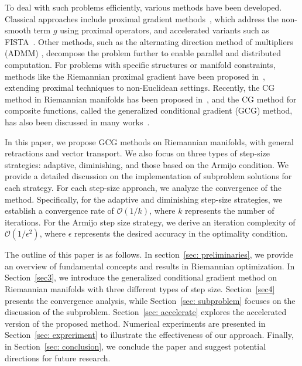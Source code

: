 \documentclass[pdflatex,sn-mathphys-num]{sn-jnl}%
\theoremstyle{definition} %
\theoremstyle{remark} %
\begin{document}
To deal with such problems efficiently, various methods have been developed. Classical approaches include proximal gradient methods~\cite{beck2017first, FM81,parikh2014proximal}, which address the non-smooth term \( g \) using proximal operators, and accelerated variants such as FISTA~\cite{beck2009fast}.  Other methods, such as the alternating direction method of multipliers (ADMM) \cite{boyd2011distributed}, decompose the problem further to enable parallel and distributed computation. For problems with specific structures or manifold constraints, methods like the Riemannian proximal gradient have been proposed in~\cite{chen2020proximal, huang_riemannian_2022}, extending proximal techniques to non-Euclidean settings. Recently, the CG method in Riemannian manifolds has been proposed in~\cite{weber_riemannian_2023}, and the CG method for composite functions, called the generalized conditional gradient (GCG) method, has also been discussed in many works~\cite{assunccao2023generalized, yu2017generalized, zhao2023analysis, cheung2015efficient}.




In this paper, we propose GCG methods on Riemannian manifolds, with general retractions and vector transport. We also focus on three types of step-size strategies: adaptive, diminishing, and those based on the Armijo condition. We provide a detailed discussion on the implementation of subproblem solutions for each strategy. For each step-size approach, we analyze the convergence of the method. 
Specifically, for the adaptive and diminishing step-size strategies, we establish a convergence rate of  $\mathcal{O}(1/k)$, where \(k\) represents the number of iterations. For the Armijo step size strategy, we derive an iteration complexity of \(\mathcal{O}(1/\epsilon^2)\), where \(\epsilon\) represents the desired accuracy in the optimality condition. 

The outline of this paper is as follows.
In section~\ref{sec: preliminaries}, we provide an overview of fundamental concepts and results in Riemannian optimization.
In Section~\ref{sec3}, we introduce the generalized conditional gradient method on Riemannian manifolds with three different types of step size. 
Section~\ref{sec4} presents the convergence analysis, while Section~\ref{sec: subproblem} focuses on the discussion of the subproblem.
Section~\ref{sec: accelerate} explores the accelerated version of the proposed method. 
Numerical experiments are presented in Section~\ref{sec: expreriment} to illustrate the effectiveness of our approach. Finally, in Section~\ref{sec: conclusion}, we conclude the paper and suggest potential directions for future research.
\end{document}
